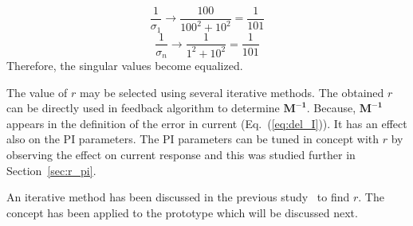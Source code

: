\begin{equation*}
    \frac{1}{\sigma_1} \rightarrow \frac{100}{100^2+10^2}=\frac{1}{101} 
\end{equation*}
\begin{equation*}
    \frac{1}{\sigma_n} \rightarrow \frac{1}{1^2+10^2}=\frac{1}{101} 
\end{equation*}
Therefore, the singular values become equalized.

The value of $r$ may be selected using several iterative methods. The obtained $r$ can be directly used in feedback algorithm to determine $\bm{M^{-1}}$. Because, $\bm{M^{-1}}$ appears in the definition of the error in current (Eq.~(\ref{eq:del_I})). It has an effect also on the PI parameters. The PI parameters can be tuned in concept with $r$ by observing the effect on current response and this was studied further in Section~\ref{sec:r_pi}.


An iterative method has been discussed in  the previous study~\cite{bea} to find $r$. The concept has been applied to the prototype which will be discussed next.











